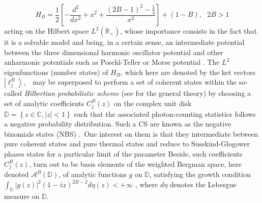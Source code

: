  \begin{equation}
      \label{r3}
H_{B}=\frac{1}{2}\left[ -\frac{d^{2}}{dx^{2}}+x^{2}+\frac{(2B-1)^{2}-\frac{1%
}{4}}{x^{2}}\right] +\left( 1-B\right) ,\text{ \ \ \ \ \ }2B>1  
\end{equation}
acting on the Hilbert space $L^{2}\left( \mathbb{R}_{+}\right) $, whose
importance consists in the fact that it is a solvable model and being, in a
certain sense, an intermediate potential between the three dimensional
harmonic oscillator potential and other anharmonic potentials such as
Poschl-Teller or Morse potential \cite{PD1, PD2}. The $L^{2}$
eigenfunctions (number states) of $H_{B}$, which here are denoted by the ket
vectors $\left\vert \ell _{j}^{B}\right\rangle ,$ \ may be superposed to
perform a set of coherent states within the so-called \textit{Hilbertian
probabilistic scheme} (see \cite{G}for the general theory) by
choosing a set of analytic coefficients $C_{j}^{B}\left( z\right) $ on the
complex unit disk $\mathbb{D=}\left\{ z\in \mathbb{C},\left\vert
z\right\vert <1\right\} $ such that the associated photon-counting
statistics follows a negative probability distribution. Such a CS are known
as the negative binomials states (NBS) \cite{Mou1}.\ One interest on
them is that they intermediate between pure coherent states and pure thermal
states \cite{GJT}and reduce to Susskind-Glogower phases states for
a particular limit of the parameter \cite{FS} Beside, such
coefficients $C_{j}^{B}\left( z\right) $, turn out to be basis elements of
the weighted Bergman space, here denoted $\mathcal{A}^{B}\left( \mathbb{D}%
\right) $, of analytic functions $g$ on $\mathbb{D}$, satisfying the growth
condition $\int_{\mathbb{D}}|g(z)|^{2}(1-\bar{z}z)^{2B-2}d\eta (z)<+\infty $%
, where $d\eta $ denotes the Lebesgue measure on $\mathbb{D}$.

